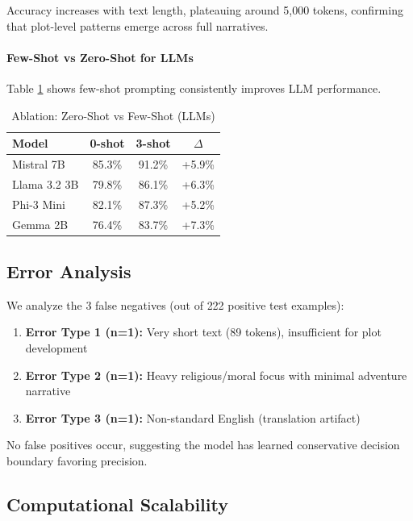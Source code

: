 \documentclass[11pt,a4paper]{article}
\begin{document}
Accuracy increases with text length, plateauing around 5,000 tokens, confirming that plot-level patterns emerge across full narratives.

\paragraph{Few-Shot vs Zero-Shot for LLMs}
Table \ref{tab:ablation_shots} shows few-shot prompting consistently improves LLM performance.

\begin{table}[h]
\centering
\small
\caption{Ablation: Zero-Shot vs Few-Shot (LLMs)}
\label{tab:ablation_shots}
\begin{tabular}{lccc}
\toprule
\textbf{Model} & \textbf{0-shot} & \textbf{3-shot} & \textbf{$\Delta$} \\
\midrule
Mistral 7B & 85.3\% & 91.2\% & +5.9\% \\
Llama 3.2 3B & 79.8\% & 86.1\% & +6.3\% \\
Phi-3 Mini & 82.1\% & 87.3\% & +5.2\% \\
Gemma 2B & 76.4\% & 83.7\% & +7.3\% \\
\bottomrule
\end{tabular}
\end{table}

\subsection{Error Analysis}

We analyze the 3 false negatives (out of 222 positive test examples):

\begin{enumerate}
    \item \textbf{Error Type 1 (n=1):} Very short text (89 tokens), insufficient for plot development
    \item \textbf{Error Type 2 (n=1):} Heavy religious/moral focus with minimal adventure narrative
    \item \textbf{Error Type 3 (n=1):} Non-standard English (translation artifact)
\end{enumerate}

No false positives occur, suggesting the model has learned conservative decision boundary favoring precision.

\subsection{Computational Scalability}
\end{document}
